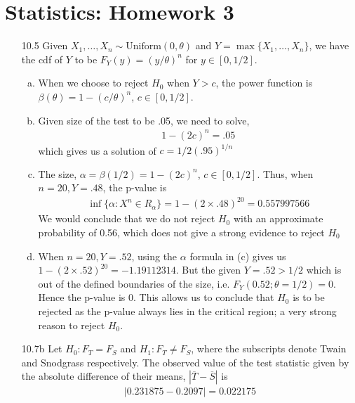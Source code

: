 \documentclass[a4paper,10pt]{article}
\theoremstyle{definition}
\begin{document}
\section*{Statistics: Homework 3}

\begin{enumerate}
\item[10.5] Given $X_1,\ldots,X_n \sim \text{Uniform}(0, \theta)$ and $Y = \max\{X_1,\ldots,X_n\}$, we have the cdf of $Y$ to be $F_Y(y)=(y/\theta)^n$ for $y \in [0,1/2]$.
\begin{enumerate}[(a)]
\item When we choose to reject $H_0$ when $Y>c$, the power function is $\beta(\theta) = 1-(c/\theta)^n$, $c \in [0,1/2]$.
\item Given size of the test to be .05, we need to solve,
\begin{align*}
1-(2c)^n = .05
\end{align*}
which gives us a solution of $c = 1/2(.95)^{1/n}$

\item The size, $\alpha = \beta(1/2) = 1- (2c)^{n}$, $c \in [0,1/2]$. Thus, when $n=20, Y = .48$, the p-value is 
\begin{align*}
\inf\{ \alpha:X^n \in R_\alpha\} = 1-(2 \times.48)^{20} = 0.557997566
\end{align*}
We would conclude that we do not reject $H_0$ with an approximate probability of 0.56, which does not give a strong evidence to reject $H_0$
\item When $n=20, Y = .52$, using the $\alpha$ formula in (c) gives us $1-(2\times.52)^{20} = -1.19112314$. But the given $Y=.52>1/2$ which is out of the defined boundaries of the size, i.e. $F_Y(0.52; \theta=1/2)=0$. Hence the p-value is 0. This allows us to conclude that $H_0$ is to be rejected as the p-value always lies in the critical region; a very strong reason to reject $H_0$.
\end{enumerate}

\item[10.7b] 
Let $H_0: F_T = F_S$ and $H_1: F_T \neq F_S$, where the subscripts denote Twain and Snodgrass respectively. The observed value of the test statistic given by the absolute difference of their means, $|\overline{T} - \overline{S}|$ is 
\begin{align*}
|0.231875 - 0.2097 |=0.022175
\end{align*}



\end{enumerate}
\end{document}
